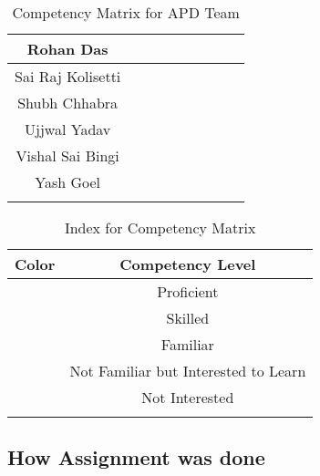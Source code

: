 \begin{center}
\begin{longtable}{|c|c|c|c|c|c|p{1.2cm}|c|c|}
Rohan Das         & \cellcolor[HTML]{92D050} & \cellcolor[HTML]{00B050} & \cellcolor[HTML]{FFC000} & \cellcolor[HTML]{F2F2F2} \\ \hline
Sai Raj Kolisetti & \cellcolor[HTML]{92D050} & \cellcolor[HTML]{92D050} & \cellcolor[HTML]{F2F2F2} & \cellcolor[HTML]{F2F2F2} \\ \hline
Shubh Chhabra     & \cellcolor[HTML]{FFFF00} & \cellcolor[HTML]{92D050} & \cellcolor[HTML]{F2F2F2} & \cellcolor[HTML]{F2F2F2} \\ \hline
Ujjwal Yadav      & \cellcolor[HTML]{92D050} & \cellcolor[HTML]{00B050} & \cellcolor[HTML]{F2F2F2} & \cellcolor[HTML]{F2F2F2} \\ \hline
Vishal Sai Bingi  & \cellcolor[HTML]{92D050} & \cellcolor[HTML]{92D050} & \cellcolor[HTML]{F2F2F2} & \cellcolor[HTML]{F2F2F2} \\ \hline
Yash Goel         & \cellcolor[HTML]{92D050} & \cellcolor[HTML]{92D050} & \cellcolor[HTML]{F2F2F2} & \cellcolor[HTML]{F2F2F2} \\ \hline
\caption{Competency Matrix for APD Team}
\end{longtable}
\end{center}



\begin{center}
\label{table:index_for_competency}
\begin{longtable}{|c|c|} \hline
Color                    & Competency Level                     \\ \hline
\cellcolor[HTML]{00B050}            & Proficient \\ \hline
\cellcolor[HTML]{92D050}            & Skilled \\ \hline
\cellcolor[HTML]{FFFF00}            & Familiar \\ \hline
\cellcolor[HTML]{FFC000}            & Not Familiar but Interested to Learn \\ \hline
\cellcolor[HTML]{D9D9D9}            & Not Interested \\ \hline
\caption{Index for Competency Matrix}
\end{longtable}
\end{center}


\newpage
\subsection{How Assignment was done}


